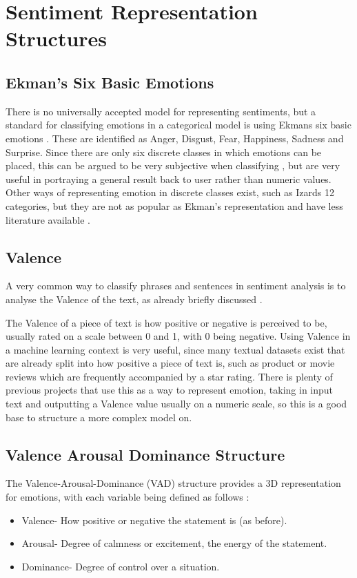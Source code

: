 
\section{Sentiment Representation Structures}

\subsection{Ekman's Six Basic Emotions}

There is no universally accepted model for representing sentiments, but a standard for classifying emotions in a categorical model is using Ekmans six basic emotions \cite{Ekman}. These are identified as Anger, Disgust, Fear, Happiness, Sadness and Surprise. Since there are only six discrete classes in which emotions can be placed, this can be argued to be very subjective when classifying \cite{emoBank}, but are very useful in portraying a general result back to user rather than numeric values. Other ways of representing emotion in discrete classes exist, such as Izards 12 categories, but they are not as popular as Ekman's representation and have less literature available \cite{izard1993stability} .

\subsection{Valence}
A very common way to classify phrases and sentences in sentiment analysis is to analyse the Valence of the text, as already briefly discussed \cite{frijda1986emotions}.

The Valence of a piece of text is how positive or negative is perceived to be, usually rated on a scale between 0 and 1, with 0 being negative.
Using Valence in a machine learning context is very useful, since many textual datasets exist that are already split into how positive a piece of text is, such as product or movie reviews which are frequently accompanied by a star rating. There is plenty of previous projects that use this as a way to represent emotion, taking in input text and outputting a Valence value usually on a numeric scale, so this is a good base to structure a more complex model on.

\subsection{Valence Arousal Dominance Structure}

The Valence-Arousal-Dominance (VAD) structure provides a 3D representation for emotions, with each variable being defined as follows \cite{VAD}:
\begin{itemize}
    \item Valence- How positive or negative the statement is (as before).
    \item Arousal- Degree of calmness or excitement, the energy of the statement. 
    \item Dominance- Degree of control over a situation.
\end{itemize}

